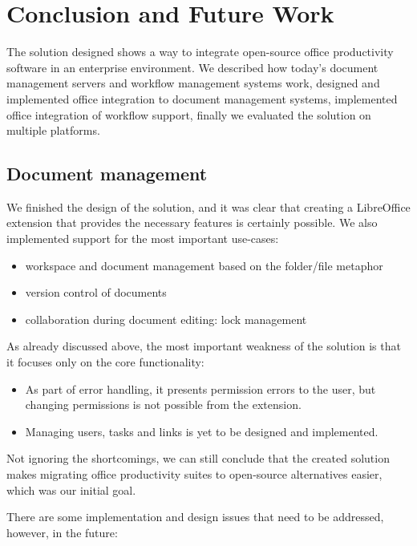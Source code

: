 \chapter{Conclusion and Future Work}

The solution designed shows a way to integrate open-source office productivity
software in an enterprise environment. We described how today's document
management servers and workflow management systems work, designed and
implemented office integration to document management systems, implemented
office integration of workflow support, finally we evaluated the solution on
multiple platforms.

\section{Document management}

We finished the design of the solution, and it was clear that creating a
LibreOffice extension that provides the necessary features is certainly
possible. We also implemented support for the most important use-cases:

\begin{itemize}
\item workspace and document management based on the folder/file metaphor
\item version control of documents
\item collaboration during document editing: lock management
\end{itemize}

As already discussed above, the most important weakness of the solution is that
it focuses only on the core functionality:

\begin{itemize}
\item As part of error handling, it presents permission errors to the user, but
changing permissions is not possible from the extension.
\item Managing users, tasks and links is yet to be designed and implemented.
\end{itemize}

Not ignoring the shortcomings, we can still conclude that the created solution
makes migrating office productivity suites to open-source alternatives easier,
which was our initial goal.

There are some implementation and design issues that need to be addressed,
however, in the future:

